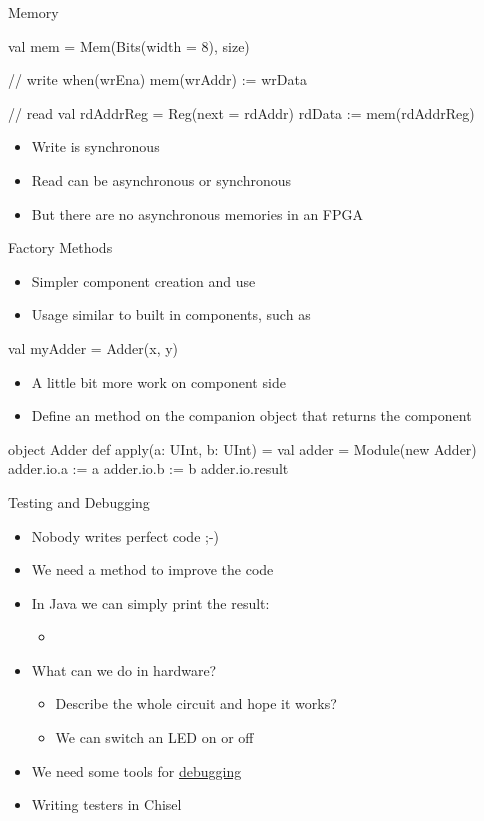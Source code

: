 \begin{frame}[fragile]{Memory}
\begin{chisel}
val mem = Mem(Bits(width = 8), size)

// write
when(wrEna) {
  mem(wrAddr) := wrData
}

// read
val rdAddrReg = Reg(next = rdAddr)
rdData := mem(rdAddrReg)
\end{chisel}
\begin{itemize}
\item Write is synchronous
\item Read can be asynchronous or synchronous
\item But there are no asynchronous memories in an FPGA
\end{itemize}
\end{frame}

\begin{frame}[fragile]{Factory Methods}
\begin{itemize}
\item Simpler component creation and use
\item Usage similar to built in components, such as 
\end{itemize}
\begin{chisel}
val myAdder = Adder(x, y)
\end{chisel}
\begin{itemize}
\item A little bit more work on component side
\item Define an  method on the companion object that returns the component
\end{itemize}
\begin{chisel}
object Adder {
  def apply(a: UInt, b: UInt) = {
    val adder = Module(new Adder)
    adder.io.a := a
    adder.io.b := b
    adder.io.result
  }
}
\end{chisel}
\end{frame}

\begin{frame}[fragile]{Testing and Debugging}
\begin{itemize}
\item Nobody writes perfect code ;-)
\item We need a method to improve the code
\item In Java we can simply print the result:
\begin{itemize}
\item {}
\end{itemize}
\item What can we do in hardware?
\begin{itemize}
\item Describe the whole circuit and hope it works?
\item We can switch an LED on or off
\end{itemize}
\item We need some tools for \href{https://en.wikipedia.org/wiki/Debugging#/media/File:H96566k.jpg}{debugging}
\item Writing testers in Chisel
\end{itemize}
\end{frame}

